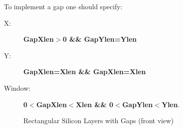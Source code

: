 To implement a gap one should specify:
\begin{description}
\item[X:] {\bf GapXlen$>$0  \&\& GapYlen=Ylen}
\item[Y:] {\bf GapXlen=Xlen \&\& GapXlen=Xlen}
\item[Window:]{\bf 0$<$GapXlen$<$Xlen \&\& 0$<$GapYlen$<$Ylen}.
\end{description}

\filbreak

\begin{figure} [htbp]
\begin{center}
\centerline{\epsfysize=3.0in }
\caption{\label{siz1} Rectangular Silicon Layers with Gaps (front view)}
\end{center}
\end{figure}

\filbreak

